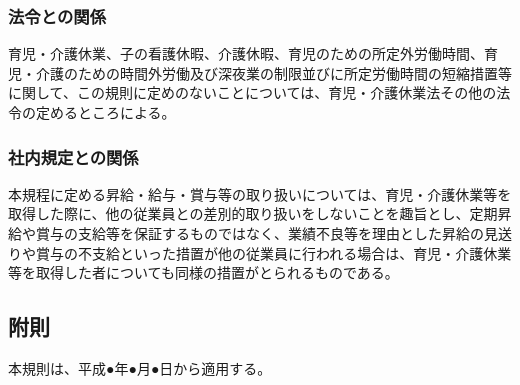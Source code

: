 \documentclass{jsarticle}
\begin{document}
\subsubsection{法令との関係}
\label{育介_項_法令との関係}
育児・介護休業、子の看護休暇、介護休暇、育児のための所定外労働時間、育児・介護のための時間外労働及び深夜業の制限並びに所定労働時間の短縮措置等に関して、この規則に定めのないことについては、育児・介護休業法その他の法令の定めるところによる。

\subsubsection{社内規定との関係}
\label{育介_項_社内規定との関係}
本規程に定める昇給・給与・賞与等の取り扱いについては、育児・介護休業等を取得した際に、他の従業員との差別的取り扱いをしないことを趣旨とし、定期昇給や賞与の支給等を保証するものではなく、業績不良等を理由とした昇給の見送りや賞与の不支給といった措置が他の従業員に行われる場合は、育児・介護休業等を取得した者についても同様の措置がとられるものである。

\subsection{附則}
本規則は、平成●年●月●日から適用する。
\end{document}

